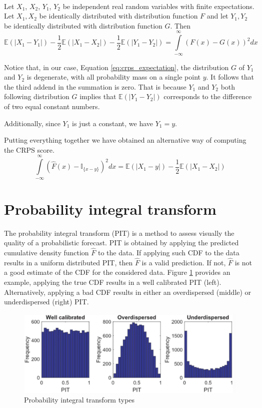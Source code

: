 \\
\begin{lemma}
    Let $X_1$, $X_2$, $Y_1$, $Y_2$ be independent real random variables with finite expectations. Let $X_1,X_2$ be identically distributed with distribution function $F$ and let $Y_1,Y_2$ be identically distributed with distribution function $G$. Then
   \begin{equation}\label{eq:crps_expectation}
    \mathbb{E}(|X_1-Y_1|)-\frac{1}{2}\mathbb{E}(|X_1-X_2|)-\frac{1}{2}\mathbb{E}(|Y_1-Y_2|)=\int\limits_{-\infty}^{\infty}\left(F(x)-G(x)\right)^2dx
\end{equation}
\end{lemma}
Notice that, in our case, Equation \ref{eq:crps_expectation}, the distribution $G$ of $Y_1$ and $Y_2$ is degenerate, with all probability mass on a single point $y$.
It follows that the third addend in the summation is zero. That is because $Y_1$ and $Y_2$ both following distribution $G$ implies that $\mathbb{E}(|Y_1-Y_2|)$ corresponds to the difference of two equal constant numbers.

Additionally, since $Y_1$ is just a constant, we have $Y_1=y$.

Putting everything together we have obtained an alternative way of computing the CRPS score.
\begin{equation}
    \int\limits_{-\infty}^{\infty}\left(\hat{F}(x)-\mathbb{I}_{\{x-y\}} \right)^2 dx=\mathbb{E}(|X_1-y|)-\frac{1}{2}\mathbb{E}(|X_1-X_2|)
\end{equation}

\section{Probability integral transform}
The probability integral transform (PIT) is a method to assess visually the quality of a probabilistic forecast. PIT is obtained by applying the predicted cumulative density function $\hat{F}$ to the data. If applying such CDF to the data results in a uniform distributed PIT, then $\hat{F}$ is a valid prediction. If not, $\hat{F}$ is not a good estimate of the CDF for the considered data. Figure \ref{fig:pit} provides an example, applying the true CDF results in a well calibrated PIT (left). Alternatively, applying a bad CDF results in either an overdispersed (middle) or underdispersed (right) PIT.
\begin{figure}
    \includegraphics[width=\textwidth]{images/pit.png}
    \caption{Probability integral transform types \cite{haben2023core}}
    \label{fig:pit}
  \end{figure}

